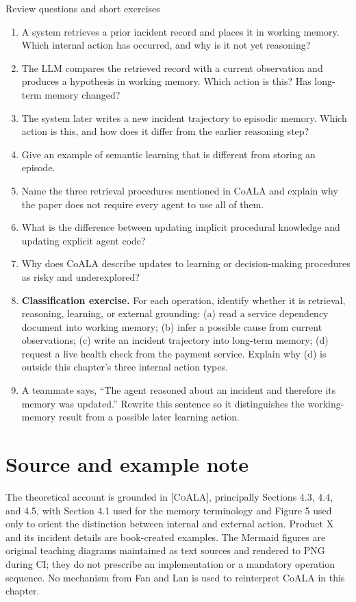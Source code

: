 \begin{reviewquestions}{Review questions and short exercises}
\begin{enumerate}
  \item A system retrieves a prior incident record and places it in working memory. Which internal action has occurred, and why is it not yet reasoning?
  \item The LLM compares the retrieved record with a current observation and produces a hypothesis in working memory. Which action is this? Has long-term memory changed?
  \item The system later writes a new incident trajectory to episodic memory. Which action is this, and how does it differ from the earlier reasoning step?
  \item Give an example of semantic learning that is different from storing an episode.
  \item Name the three retrieval procedures mentioned in CoALA and explain why the paper does not require every agent to use all of them.
  \item What is the difference between updating implicit procedural knowledge and updating explicit agent code?
  \item Why does CoALA describe updates to learning or decision-making procedures as risky and underexplored?
  \item \textbf{Classification exercise.} For each operation, identify whether it is retrieval, reasoning, learning, or external grounding: (a) read a service dependency document into working memory; (b) infer a possible cause from current observations; (c) write an incident trajectory into long-term memory; (d) request a live health check from the payment service. Explain why (d) is outside this chapter's three internal action types.
  \item A teammate says, ``The agent reasoned about an incident and therefore its memory was updated.'' Rewrite this sentence so it distinguishes the working-memory result from a possible later learning action.
\end{enumerate}
\end{reviewquestions}

\section*{Source and example note}
The theoretical account is grounded in \textsc{[CoALA]}, principally Sections 4.3, 4.4, and 4.5, with Section 4.1 used for the memory terminology and Figure 5 used only to orient the distinction between internal and external action. Product X and its incident details are book-created examples. The Mermaid figures are original teaching diagrams maintained as text sources and rendered to PNG during CI; they do not prescribe an implementation or a mandatory operation sequence. No mechanism from Fan and Lan is used to reinterpret CoALA in this chapter.
